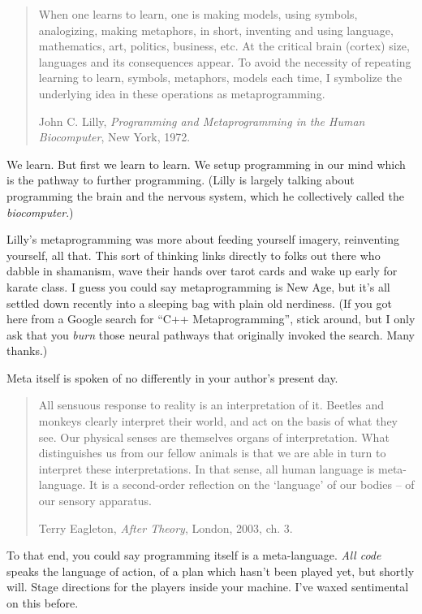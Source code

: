\documentclass[10pt,twoside]{report}
\begin{document}
\begin{quote}
When one learns to learn, one is making models, using symbols,
analogizing, making metaphors, in short, inventing and using language,
mathematics, art, politics, business, etc. At the critical brain
(cortex) size, languages and its consequences appear. To avoid the
necessity of repeating learning to learn, symbols, metaphors, models
each time, I symbolize the underlying idea in these operations as
metaprogramming.

John C. Lilly, {\em Programming and Metaprogramming in the Human
  Biocomputer}, New York, 1972.

\end{quote}


We learn.  But first we learn to learn.  We setup programming in our
mind which is the pathway to further programming.  (Lilly is largely
talking about programming the brain and the nervous system, which he
collectively called the {\em biocomputer}.)

Lilly's metaprogramming was more about feeding yourself imagery,
reinventing yourself, all that. This sort of thinking links directly
to folks out there who dabble in shamanism, wave their hands over
tarot cards and wake up early for karate class.  I guess you could say
metaprogramming is New Age, but it's all settled down recently into a
sleeping bag with plain old nerdiness.  (If you got here from a Google
search for ``C++ Metaprogramming'', stick around, but I only ask that
you {\em burn} those neural pathways that originally invoked the
search.  Many thanks.)

Meta itself is spoken of no differently in your author's present day.

\begin{quote}
All sensuous response to reality is an interpretation of it.  Beetles
and monkeys clearly interpret their world, and act on the basis of
what they see. Our physical senses are themselves organs of
interpretation.  What distinguishes us from our fellow animals is that
we are able in turn to interpret these interpretations.  In that
sense, all human language is meta-language.  It is a second-order
reflection on the `language' of our bodies -- of our sensory
apparatus.

Terry Eagleton, {\em After Theory}, London, 2003, ch. 3.

\end{quote}


To that end, you could say programming itself is a meta-language.
{\em All code} speaks the language of action, of a plan which hasn't
been played yet, but shortly will.  Stage directions for the players
inside your machine.  I've waxed sentimental on this before.
\end{document}
